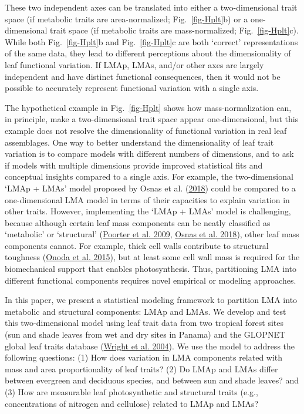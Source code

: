 \documentclass[
  12pt,
  a4paper,
,tablecaptionabove
]{scrartcl}
\begin{document}
These two independent axes can be translated into either a
two-dimensional trait space (if metabolic traits are area-normalized;
Fig.~\ref{fig-Hplt}b) or a one-dimensional trait space (if metabolic
traits are mass-normalized; Fig.~\ref{fig-Hplt}c). While both
Fig.~\ref{fig-Hplt}b and Fig.~\ref{fig-Hplt}c are both `correct'
representations of the same data, they lead to different perceptions
about the dimensionality of leaf functional variation. If LMAp, LMAs,
and/or other axes are largely independent and have distinct functional
consequences, then it would not be possible to accurately represent
functional variation with a single axis.

The hypothetical example in Fig.~\ref{fig-Hplt} shows how
mass-normalization can, in principle, make a two-dimensional trait space
appear one-dimensional, but this example does not resolve the
dimensionality of functional variation in real leaf assemblages. One way
to better understand the dimensionality of leaf trait variation is to
compare models with different numbers of dimensions, and to ask if
models with multiple dimensions provide improved statistical fits and
conceptual insights compared to a single axis. For example, the
two-dimensional `LMAp + LMAs' model proposed by Osnas et al.
(\protect\hyperlink{ref-Osnas2018}{2018}) could be compared to a
one-dimensional LMA model in terms of their capacities to explain
variation in other traits. However, implementing the `LMAp + LMAs' model
is challenging, because although certain leaf mass components can be
neatly classified as `metabolic' or `structural'
(\protect\hyperlink{ref-Poorter2009}{Poorter et al. 2009},
\protect\hyperlink{ref-Osnas2018}{Osnas et al. 2018}), other leaf mass
components cannot. For example, thick cell walls contribute to
structural toughness (\protect\hyperlink{ref-Onoda2015}{Onoda et al.
2015}), but at least some cell wall mass is required for the
biomechanical support that enables photosynthesis. Thus, partitioning
LMA into different functional components requires novel empirical or
modeling approaches.

In this paper, we present a statistical modeling framework to partition
LMA into metabolic and structural components: LMAp and LMAs. We develop
and test this two-dimensional model using leaf trait data from two
tropical forest sites (sun and shade leaves from wet and dry sites in
Panama) and the GLOPNET global leaf traits database
(\protect\hyperlink{ref-Wright2004a}{Wright et al. 2004}). We use the
model to address the following questions: (1) How does variation in LMA
components related with mass and area proportionality of leaf traits?
(2) Do LMAp and LMAs differ between evergreen and deciduous species, and
between sun and shade leaves? and (3) How are measurable leaf
photosynthetic and structural traits (e.g., concentrations of nitrogen
and cellulose) related to LMAp and LMAs?
\end{document}
